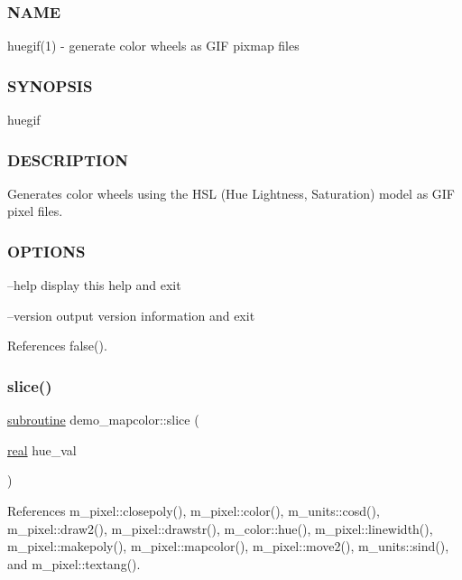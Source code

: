 \subsubsection*{N\+A\+ME}

huegif(1) -\/ generate color wheels as G\+IF pixmap files 

\subsubsection*{S\+Y\+N\+O\+P\+S\+IS}

\begin{DoxyVerb}huegif
\end{DoxyVerb}


\subsubsection*{D\+E\+S\+C\+R\+I\+P\+T\+I\+ON}

\begin{DoxyVerb} Generates color wheels using the HSL (Hue Lightness, Saturation)
 model as GIF pixel files.
\end{DoxyVerb}


\subsubsection*{O\+P\+T\+I\+O\+NS}

--help display this help and exit

--version output version information and exit 

References false().

\mbox{\label{huegif_8f90_a303c71c69a7b51abd347bd12cea7014f}} 
\subsubsection{\texorpdfstring{slice()}{slice()}}
{\footnotesize\ttfamily \hyperlink{M__stopwatch_83_8txt_acfbcff50169d691ff02d4a123ed70482}{subroutine} demo\+\_\+mapcolor\+::slice (\begin{DoxyParamCaption}\item[{\hyperlink{read__watch_83_8txt_abdb62bde002f38ef75f810d3a905a823}{real}}]{hue\+\_\+val }\end{DoxyParamCaption})}



References m\+\_\+pixel\+::closepoly(), m\+\_\+pixel\+::color(), m\+\_\+units\+::cosd(), m\+\_\+pixel\+::draw2(), m\+\_\+pixel\+::drawstr(), m\+\_\+color\+::hue(), m\+\_\+pixel\+::linewidth(), m\+\_\+pixel\+::makepoly(), m\+\_\+pixel\+::mapcolor(), m\+\_\+pixel\+::move2(), m\+\_\+units\+::sind(), and m\+\_\+pixel\+::textang().

